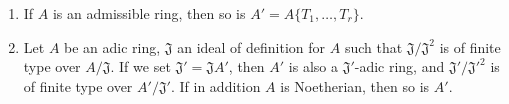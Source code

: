 \begin{prop}[7.5.4]
\label{0.7.5.4}
\medskip\noindent
\begin{enumerate}[label={\rm(\roman*)}]
  \item If $A$ is an admissible ring, then so is $A'=A\{T_1,\dots,T_r\}$.
  \item Let $A$ be an adic ring, $\mathfrak{J}$ an ideal of definition for
    $A$ such that $\mathfrak{J}/\mathfrak{J}^2$ is of finite type
    over $A/\mathfrak{J}$. If we set $\mathfrak{J}'=\mathfrak{J}A'$, then $A'$ is also a
    $\mathfrak{J}'$-adic ring, and $\mathfrak{J}'/{\mathfrak{J}'}^2$ is of finite type over
    $A'/\mathfrak{J}'$. If in addition $A$ is Noetherian, then so is $A'$.
\end{enumerate}
\end{prop}

